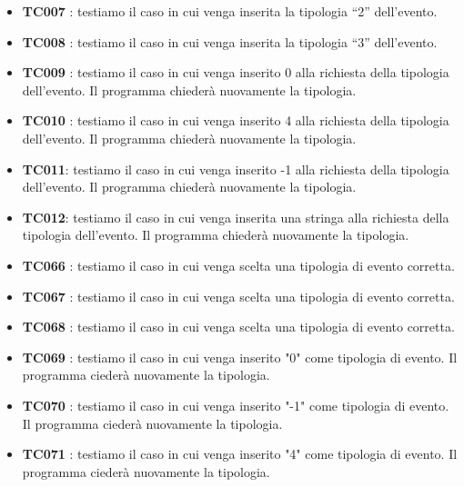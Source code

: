 \documentclass[11pt]{scrartcl} %
\begin{document}
\begin{itemize}


	\item \textbf{TC007} : testiamo il caso in cui venga inserita la tipologia “2” dell’evento.

	\item \textbf{TC008} : testiamo il caso in cui venga inserita la tipologia “3” dell’evento.

	\item \textbf{TC009} : testiamo il caso in cui venga inserito 0 alla richiesta della tipologia dell’evento. Il programma chiederà nuovamente la tipologia.

	\item \textbf{TC010} : testiamo il caso in cui venga inserito 4 alla richiesta della tipologia dell’evento. Il programma chiederà nuovamente la tipologia.

	\item \textbf{TC011}: testiamo il caso in cui venga inserito -1 alla richiesta della tipologia dell’evento. Il programma chiederà nuovamente la tipologia.

	\item \textbf{TC012}: testiamo il caso in cui venga inserita una stringa alla richiesta della tipologia dell’evento. Il programma chiederà nuovamente la tipologia.

	\item \textbf{TC066} : testiamo il caso in cui venga scelta una tipologia di evento corretta.

	\item \textbf{TC067} : testiamo il caso in cui venga scelta una tipologia di evento corretta.

	\item \textbf{TC068} : testiamo il caso in cui venga scelta una tipologia di evento corretta.

	\item \textbf{TC069} : testiamo il caso in cui venga inserito "0"  come tipologia di evento. Il programma ciederà nuovamente la tipologia.

	\item \textbf{TC070} : testiamo il caso in cui venga inserito "-1" come tipologia di evento. Il programma ciederà nuovamente la tipologia.

	\item \textbf{TC071} : testiamo il caso in cui venga inserito "4"  come tipologia di evento. Il programma ciederà nuovamente la tipologia.

\end{itemize}
\end{document}
